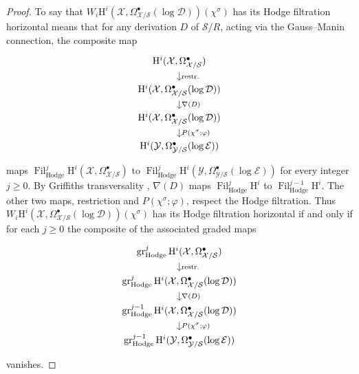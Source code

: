 \begin{proof}
To say that \(W_i\mathrm{H}^i(\mathcal{X},\Omega^\bullet_{\mathcal{X}/\mathcal{S}}(\log\mathcal{D}))(\chi^\sigma)\) has its Hodge filtration horizontal means that for any derivation \(D\) of \(\mathcal{S}/R\), acting via the Gauss--Manin connection, the composite map
\[
\begin{tikzcd}[column sep=large,row sep=small]
\mathrm{H}^i(\mathcal{X},\Omega^\bullet_{\mathcal{X}/\mathcal{S}})
\arrow[d,"\operatorname{restr.}"]\\
\mathrm{H}^i(\mathcal{X},\Omega^\bullet_{\mathcal{X}/\mathcal{S}}(\log\mathcal{D}))
\arrow[d,"\nabla(D)"]\\
\mathrm{H}^i(\mathcal{X},\Omega^\bullet_{\mathcal{X}/\mathcal{S}}(\log\mathcal{D}))
\arrow[d,"P(\chi^\sigma;\varphi)"]\\
\mathrm{H}^i(\mathcal{Y},\Omega^\bullet_{\mathcal{Y}/\mathcal{S}}(\log\mathcal{E}))
\end{tikzcd}
\]
maps \(\operatorname{Fil}^j_{\mathrm{Hodge}}\mathrm{H}^i(\mathcal{X},\Omega^\bullet_{\mathcal{X}/\mathcal{S}})\) to \(\operatorname{Fil}^j_{\mathrm{Hodge}}\mathrm{H}^i(\mathcal{Y},\Omega^\bullet_{\mathcal{Y}/\mathcal{S}}(\log\mathcal{E}))\) for every integer \(j\geq0\). By Griffiths transversality \cite[1.4.1.6]{Ka-ASDE}, \(\nabla(D)\) maps \(\operatorname{Fil}^j_{\mathrm{Hodge}}\mathrm{H}^i\) to \(\operatorname{Fil}^{j-1}_{\mathrm{Hodge}}\mathrm{H}^i\). The other two maps, restriction and \(P(\chi^\sigma;\varphi)\), respect the Hodge filtration. Thus \(W_i\mathrm{H}^i(\mathcal{X},\Omega^\bullet_{\mathcal{X}/\mathcal{S}}(\log\mathcal{D}))(\chi^\sigma)\) has its Hodge filtration horizontal if and only if for each \(j\geq0\) the composite of the associated graded maps
\[
\begin{tikzcd}[column sep=large,row sep=small]
\operatorname{gr}^j_{\mathrm{Hodge}}\mathrm{H}^i(\mathcal{X},\Omega^\bullet_{\mathcal{X}/\mathcal{S}})
\arrow[d,"\operatorname{restr.}"]\\
\operatorname{gr}^j_{\mathrm{Hodge}}\mathrm{H}^i(\mathcal{X},\Omega^\bullet_{\mathcal{X}/\mathcal{S}}(\log\mathcal{D}))
\arrow[d,"\nabla(D)"]\\
\operatorname{gr}^{j-1}_{\mathrm{Hodge}}\mathrm{H}^i(\mathcal{X},\Omega^\bullet_{\mathcal{X}/\mathcal{S}}(\log\mathcal{D}))
\arrow[d,"P(\chi^\sigma;\varphi)"]\\
\operatorname{gr}^{j-1}_{\mathrm{Hodge}}\mathrm{H}^i(\mathcal{Y},\Omega^\bullet_{\mathcal{Y}/\mathcal{S}}(\log\mathcal{E}))
\end{tikzcd}
\]
vanishes.


\end{proof}
